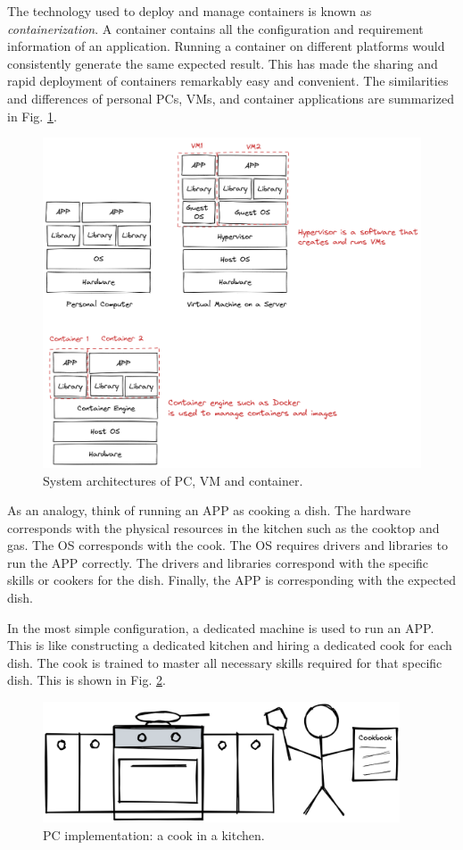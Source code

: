 The technology used to deploy and manage containers is known as \textit{containerization}. A container contains all the configuration and requirement information of an application. Running a container on different platforms would consistently generate the same expected result. This has made the sharing and rapid deployment of containers remarkably easy and convenient. The similarities and differences of personal PCs, VMs, and container applications are summarized in Fig. \ref{ch:vac:fig:pcvmcontainersructure}.

\begin{figure}
	\centering
	\includegraphics[width=350pt]{chapters/part-3/figures/pcvmcontainerstructure.png}
	\caption{System architectures of PC, VM and container.} \label{ch:vac:fig:pcvmcontainersructure}
\end{figure}

As an analogy, think of running an APP as cooking a dish. The hardware corresponds with the physical resources in the kitchen such as the cooktop and gas. The OS corresponds with the cook. The OS requires drivers and libraries to run the APP correctly. The drivers and libraries correspond with the specific skills or cookers for the dish. Finally, the APP is corresponding with the expected dish.

In the most simple configuration, a dedicated machine is used to run an APP. This is like constructing a dedicated kitchen and hiring a dedicated cook for each dish. The cook is trained to master all necessary skills required for that specific dish. This is shown in Fig. \ref{ch:vac:fig:acookinakitchen}.
\begin{figure}[htbp]
	\centering
	\includegraphics[width=300pt]{chapters/part-3/figures/acookinakitchen.png}
	\caption{PC implementation: a cook in a kitchen.} \label{ch:vac:fig:acookinakitchen}
\end{figure}


